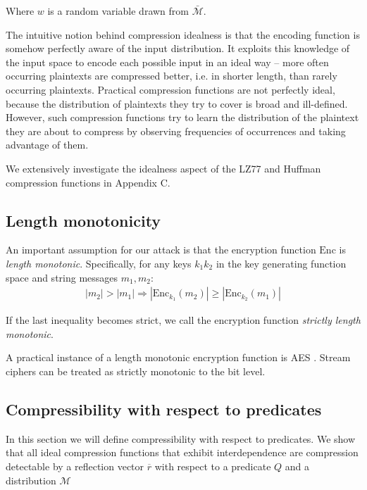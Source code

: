 Where $w$ is a random variable drawn from $\bar{\mathcal{M}}$.

The intuitive notion behind compression idealness is that the encoding
function is somehow perfectly aware of the input distribution. It
exploits this knowledge of the input space to encode each possible
input in an ideal way – more often occurring plaintexts are compressed
better, i.e. in shorter length, than rarely occurring plaintexts.
Practical compression functions are not perfectly ideal, because the
distribution of plaintexts they try to cover is broad and ill-defined.
However, such compression functions try to learn the distribution of
the plaintext they are about to compress by observing frequencies of
occurrences and taking advantage of them.

We extensively investigate the idealness aspect of the LZ77 and Huffman compression
functions in Appendix C.

\subsection{Length monotonicity}\label{subsec:lenmonotone}

An important assumption for our attack is that the encryption function
$\textrm{Enc}$ is \textit{length monotonic}. Specifically, for any keys $k_1
k_2$ in the key generating function space and string messages $m_1, m_2$:
\begin{equation*}
\begin{split}
|m_2| > |m_1|
\Rightarrow
|\textrm{Enc}_{k_1}(m_2)| \geq |\textrm{Enc}_{k_2}(m_1)|
\end{split}
\end{equation*}

If the last inequality becomes strict, we call the encryption function
\textit{strictly length monotonic}.

A practical instance of a length monotonic encryption function is AES \cite{standard2001announcing}.
Stream ciphers can be treated as strictly monotonic to the bit level.

\subsection{Compressibility with respect to predicates}\label{subsec:propertycom}
In this section we will define compressibility with respect to predicates. We
show that all ideal compression functions that exhibit interdependence are
compression detectable by a reflection vector $\overbar{r}$ with respect to a
predicate $Q$ and a distribution $\mathcal{M}$

